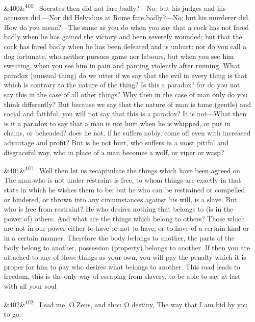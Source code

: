 \documentclass[12pt]{article}
\newcommand{\para}[1][]{\par\noindent\ifx&#1&\else\textsuperscript{\footnotesize #1}~\fi}
\begin{document}
\para[400] Socrates then did not fare badly?—No; but his judges and his accusers did.—Nor did Helvidius at Rome fare badly?—No; but his murderer did. How do you mean?—The same as you do when you say that a cock has not fared badly when he has gained the victory and been severely wounded; but that the cock has fared badly when he has been defeated and is unhurt: nor do you call a dog fortunate, who neither pursues game nor labours, but when you see him sweating, when you see him in pain and panting violently after running. What paradox (unusual thing) do we utter if we say that the evil in every thing is that which is contrary to the nature of the thing? Is this a paradox? for do you not say this in the case of all other things? Why then in the case of man only do you think differently? But because we say that the nature of man is tame (gentle) and social and faithful, you will not say that this is a paradox? It is not—What then is it a paradox to say that a man is not hurt when he is whipped, or put in chains, or beheaded? does he not, if he suffers nobly, come off even with increased advantage and profit? But is he not hurt, who suffers in a most pitiful and disgraceful way, who in place of a man becomes a wolf, or viper or wasp?

\para[401] Well then let us recapitulate the things which have been agreed on. The man who is not under restraint is free, to whom things are exactly in that state in which he wishes them to be; but he who can be restrained or compelled or hindered, or thrown into any circumstances against his will, is a slave. But who is free from restraint? He who desires nothing that belongs to (is in the power of) others. And what are the things which belong to others? Those which are not in our power either to have or not to have, or to have of a certain kind or in a certain manner. Therefore the body belongs to another, the parts of the body belong to another, possession (property) belongs to another. If then you are attached to any of these things as your own, you will pay the penalty which it is proper for him to pay who desires what belongs to another. This road leads to freedom, this is the only way of escaping from slavery, to be able to say at last with all your soul

\para[402] Lead me, O Zeus, and thou O destiny, The way that I am bid by you to go.
\end{document}
